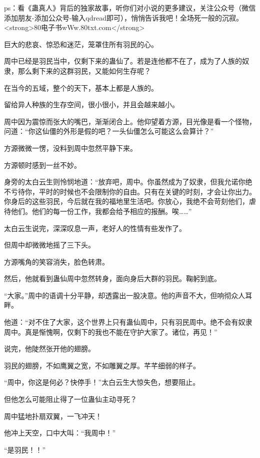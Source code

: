 
\begin{this_body}

ps：看《蛊真人》背后的独家故事，听你们对小说的更多建议，关注公众号（微信添加朋友-添加公众号-输入qdread即可），悄悄告诉我吧！全场死一般的沉寂。<strong>80电子书wWw.80txt.com</strong>

巨大的悲哀、惊恐和迷茫，笼罩住所有羽民的心。

周中已经是羽民当中，仅剩下来的蛊仙了。若是连他都不在了，成为了人族的奴隶，那么剩下来的这群羽民，又能如何生存呢？

在当今的五域，整个的天下，基本上都是人族的。

留给异人种族的生存空间，很小很小，并且会越来越小。

周中因为震惊而张大的嘴巴，渐渐闭合上。他仰望着方源，目光像是看一个怪物，问道：“你这仙僵的外形是假的吧？一头仙僵怎么可能这么会算计？”

方源微微一愣，没料到周中忽然平静下来。

方源顿时感到一丝不妙。

身旁的太白云生则怜悯地道：“放弃吧，周中。你虽然成为了奴隶，但我允诺你绝不亏待你，平时的时候也不会限制你的自由。只有在关键的时刻，才会让你出力。你身后的这些羽民，今后就在我的福地里生活吧。你放心，我绝不会苛刻他们，虐待他们。他们的每一份工作，我都会给予相应的报酬。唉……”

太白云生说完，深深叹息一声，老好人的性情有些发作了。

但周中却微微地摇了三下头。

方源嘴角的笑容消失，脸色转肃。

然后，他就看到蛊仙周中忽然转身，面向身后大群的羽民。鞠躬到底。

“大家。”周中的语调十分平静，却透露出一股决意。他的声音不大，但响彻众人耳畔。

他道：“对不住了大家，这个世界上只有蛊仙周中，只有羽民周中。绝不会有奴隶周中。真是惭愧啊，仅剩下的我也不能在守护大家了。诸位，再见！”

说完，他陡然张开他的翅膀。

羽民的翅膀，不如鹰翼之宽，不如雕翼之厚。芊芊细弱的样子。

“周中，你这是何必？快停手！”太白云生大惊失色，想要阻止。

但他怎么可能阻止得了一位蛊仙主动寻死？

周中猛地扑扇双翼，一飞冲天！

他冲上天空，口中大叫：“我周中！”

“是羽民！！”


\end{this_body}
